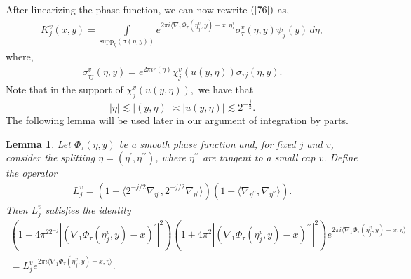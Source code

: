 \documentclass[12pt, reqno]{amsart}
\newtheorem{lemma}[theorem]{Lemma}
\theoremstyle{definition}
\theoremstyle{remark}
\numberwithin{equation}{section}
\begin{document}
After linearizing the phase function, we can now rewrite $(\ref{76})$ as,
    \begin{align}        K_j^v(x,y)=\int\limits_{ \text{supp}_\eta(\sigma(\eta,y))} e^{2\pi i \langle \nabla_1\Phi_{\tau}(\eta_j^v,y)-x,\eta\rangle}\sigma_{\tau}^v(\eta,y)\psi_j(y)\,d\eta, \label{77}
    \end{align}
where,
\begin{align*}
    \sigma_{\tau j}^v(\eta,y)=e^{2\pi i r(\eta)}\chi_j^v(u(y,\eta))\sigma_{ \tau j}(\eta,y).
\end{align*}
Note that in the support of $\chi_j^v(u(y,\eta)),$ we have that 
$$|\eta|\lesssim |(y,\eta)|\asymp  |u(y,\eta)|\lesssim 2^{-\frac{j}{2}}.$$
The following lemma will be used later in our argument of integration by parts.

\begin{lemma}
    Let $\Phi_\tau(\eta,y)$ be a smooth phase function and, for fixed $j$ and $v$, consider the splitting $\eta = (\eta^{\prime},\eta^{\prime\prime})$, where $\eta^{\prime\prime}$ are tangent to a small cap $v$. Define the operator
\begin{align*}
L^v_j=(1-\langle2^{-j/2}\nabla_{{\eta}^{\prime}},2^{-j/2}\nabla_{{\eta}^{\prime}}\rangle)(1-\langle\nabla_{{\eta}^{\prime\prime}},\nabla_{{\eta}^{\prime\prime}}\rangle).
\end{align*}
Then $L_j^v$ satisfies the identity
\begin{align*}
     (1+4\pi^22^{-j}|( \nabla_1\Phi_{\tau}(\eta_j^v,y)-x)^{\prime}|^2)(1+4\pi^2|( \nabla_1\Phi_{\tau}(\eta_j^v,y)-x)^{\prime\prime}|^2)e^{2\pi i \langle \nabla_1\Phi_{\tau}(\eta_j^v,y)-x,\eta\rangle}\\
     =L^v_je^{2\pi i \langle \nabla_1\Phi_{\tau}(\eta_j^v,y)-x,\eta\rangle}.
\end{align*}
\end{lemma}
\end{document}
